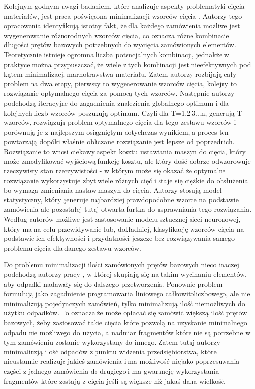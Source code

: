 Kolejnym godnym uwagi badaniem, które analizuje aspekty problematyki cięcia materiałów, jest praca poświęcona minimalizacji wzorców cięcia \cite{patterns-reduction}. Autorzy tego opracowania identyfikują istotny fakt, że dla każdego zamówienia możliwe jest wygenerowanie różnorodnych wzorców cięcia, co oznacza różne kombinacje długości prętów bazowych potrzebnych do wycięcia zamówionych elementów. Teoretycznie istnieje ogromna liczba potencjalnych kombinacji, jednakże w praktyce można przypuszczać, że wiele z tych kombinacji jest nieefektywnych pod kątem minimalizacji marnotrawstwa materiału. Zatem autorzy rozbijają cały problem na dwa etapy, pierwszy to wygenerowanie wzorców cięcia, kolejny to rozwiązanie optymalnego cięcia za pomocą tych wzorców. Następnie autorzy podchodzą iteracyjne do zagadnienia znalezienia globalnego optimum i dla kolejnych liczb wzorców poszukują optimum. Czyli dla T=1,2,3...n, generują T wzorców, rozwiązują problem optymalnego cięcia dla tego zestawu wzorców i porównują je z najlepszym osiągniętym dotychczas wynikiem, a proces ten powtarzają dopóki właśnie obliczane rozwiązanie jest lepsze od poprzednich. Rozwiązanie to wnosi ciekawy aspekt kosztu ustawiania maszyn do cięcia, który może zmodyfikować wyjściową funkcję kosztu, ale który dość dobrze odwzorowuje rzeczywisty stan rzeczywistości - w którym może się okazać że optymalne rozwiązanie wykorzystuje zbyt wiele różnych cięć i staje się ciężkie do obsłużenia bo wymaga zmieniania nastaw maszyn do cięcia. Autorzy stosują model statystyczny, który generuje najbardziej prawdopodobne wzorce na podstawie zamówienia ale pozostałej tutaj otwarta furtka do usprawniania tego rozwiązania. Według autorów możliwe jest zastosowanie modelu sztucznej sieci neuronowej, który ma na celu przewidywanie lub, dokładniej, klasyfikację wzorców cięcia na podstawie ich efektywności i przydatności jeszcze bez rozwiązywania samego problemu cięcia dla danego zestawu wzorców. 

Do problemu minimalizacji ilości zamówionych prętów bazowych nieco inaczej podchodzą autorzy pracy \cite{structural-tubes}, w której skupiają się na takim wycinaniu elementów, aby odpadki nadawały się do dalszego przetworzenia. Ponownie problem formułują jako zagadnienie programowania liniowego całkowitoliczbowego, ale nie minimalizują pojedynczych zamówień, tylko minimalizują ilość niemożliwych do użytku odpadków. To oznacza że może opłacać się zamówić większą ilość prętów bazowych, żeby zastosować takie cięcia które pozwolą na uzyskanie minimalnego odpadu nie możliwego do użycia, a nadmiar fragmentów które nie są potrzebne w tym zamówieniu zostanie wykorzystany do innego. Zatem tutaj autorzy minimaliuzją ilość odpadów z punktu widzenia przedsiębiorstwa, które nieustannie realizuje jakieś zamówienia i ma możliwość niejako poprzesuwania części z jednego zamówienia do drugiego i ma gwarancję wykorzystania fragmentów które zostają z cięcia jeśli są większe niż jakaś dana wielkość.


